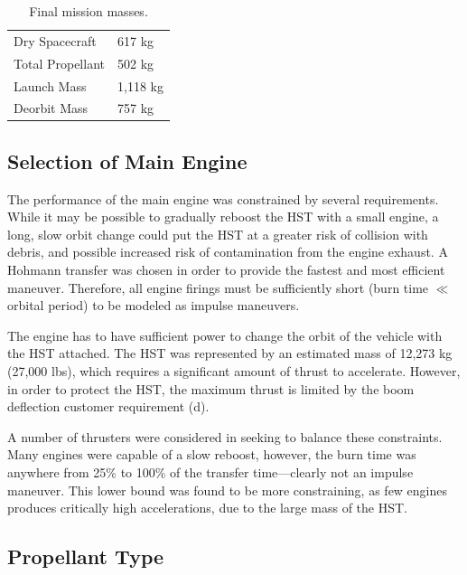 \documentclass[paper=letter, fontsize=11pt]{scrartcl} %
\numberwithin{equation}{section} %
\numberwithin{figure}{section} %
\numberwithin{table}{section} %
\begin{document}
\begin{table}[H]
    \begin{center}
        \begin{tabular}{ll}
            \toprule
            Dry Spacecraft   & 617 kg   \\
            Total Propellant & 502 kg   \\
            Launch Mass      & 1,118 kg \\
            Deorbit Mass     & 757 kg   \\
            \bottomrule
        \end{tabular}
    \end{center}
    \caption{Final mission masses.}
    \label{table:final_masses}
\end{table}

\subsection{Selection of Main Engine}
The performance of the main engine was constrained by several requirements. While it may be possible to gradually reboost the HST with a small engine, a long, slow orbit change could put the HST at a greater risk of collision with debris, and possible increased risk of contamination from the engine exhaust. A Hohmann transfer was chosen in order to provide the fastest and most efficient maneuver. Therefore, all engine firings must be sufficiently short (burn time $\ll$ orbital period) to be modeled as impulse maneuvers.

The engine has to have sufficient power to change the orbit of the vehicle with the HST attached. The HST was represented by an estimated mass of 12,273 kg (27,000 lbs), which requires a significant amount of thrust to accelerate. However, in order to protect the HST, the maximum thrust is limited by the boom deflection customer requirement (d).

A number of thrusters were considered in seeking to balance these constraints. Many engines were capable of a slow reboost, however, the burn time was anywhere from 25\% to 100\% of the transfer time---clearly not an impulse maneuver. This lower bound was found to be more constraining, as few engines produces critically high accelerations, due to the large mass of the HST.

\subsection{Propellant Type}
\end{document}
